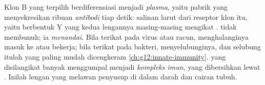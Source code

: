 \begin{proposition}\label{prop:g12:adaptive-immunity:antibodies}
Klon B yang terpilih berdiferensiasi menjadi \emph{ plasma}, yaitu
pabrik yang menyekresikan ribuan \emph{antibodi} tiap
detik: salinan larut dari reseptor klon itu, yaitu  berbentuk Y
yang kedua lengannya masing-masing mengikat .  tidak
membunuh; ia \emph{menandai}. Bila terikat pada virus atau racun,
 menghalanginya masuk ke  atau bekerja; bila terikat pada
bakteri,  menyelubunginya, dan selubung itulah yang paling
mudah dicengkeram  \cref{ch:g12:innate-immunity}.  yang
disilangikat banyak  menggumpal menjadi \emph{kompleks imun},
yang dibersihkan lewat . Inilah lengan yang melawan penyusup
di dalam darah dan cairan tubuh.
\end{proposition}
\admitted

